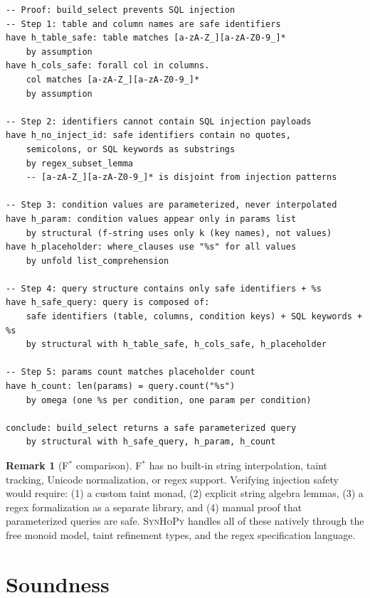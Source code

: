 \documentclass[11pt,a4paper]{report}
\theoremstyle{definition}
\newtheorem{remark}[definition]{Remark}
\theoremstyle{plain}
\newcommand{\fstar}{F$^{*}$}
\newcommand{\synhopy}{\textsc{SynHoPy}}
\begin{document}
\begin{lstlisting}[style=proof]
-- Proof: build_select prevents SQL injection
-- Step 1: table and column names are safe identifiers
have h_table_safe: table matches [a-zA-Z_][a-zA-Z0-9_]*
    by assumption
have h_cols_safe: forall col in columns.
    col matches [a-zA-Z_][a-zA-Z0-9_]*
    by assumption

-- Step 2: identifiers cannot contain SQL injection payloads
have h_no_inject_id: safe identifiers contain no quotes,
    semicolons, or SQL keywords as substrings
    by regex_subset_lemma
    -- [a-zA-Z_][a-zA-Z0-9_]* is disjoint from injection patterns

-- Step 3: condition values are parameterized, never interpolated
have h_param: condition values appear only in params list
    by structural (f-string uses only k (key names), not values)
have h_placeholder: where_clauses use "%s" for all values
    by unfold list_comprehension

-- Step 4: query structure contains only safe identifiers + %s
have h_safe_query: query is composed of:
    safe identifiers (table, columns, condition keys) + SQL keywords + %s
    by structural with h_table_safe, h_cols_safe, h_placeholder

-- Step 5: params count matches placeholder count
have h_count: len(params) = query.count("%s")
    by omega (one %s per condition, one param per condition)

conclude: build_select returns a safe parameterized query
    by structural with h_safe_query, h_param, h_count
\end{lstlisting}

\begin{remark}[\fstar{} comparison]
\fstar{} has no built-in string interpolation, taint tracking, Unicode
normalization, or regex support.  Verifying injection safety would require:
(1) a custom taint monad, (2) explicit string algebra lemmas, (3) a regex
formalization as a separate library, and (4) manual proof that parameterized
queries are safe.  \synhopy{} handles all of these natively through the
free monoid model, taint refinement types, and the regex specification language.
\end{remark}



\part{Soundness}
\end{document}
